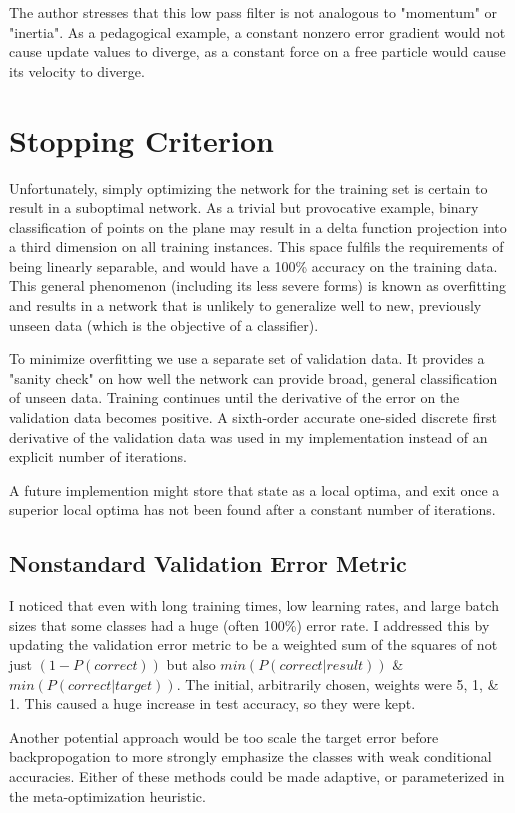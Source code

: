 \documentclass[10pt, conference, compsocconf]{IEEEtran}
\begin{document}
The author stresses that this low pass filter is not analogous to "momentum" or "inertia". As a pedagogical example, a constant nonzero error gradient would not cause update values to diverge, as a constant force on a free particle would cause its velocity to diverge.


\section{Stopping Criterion}
Unfortunately, simply optimizing the network for the training set is certain to result in a suboptimal network. As a trivial but provocative example, binary classification of points on the plane may result in a delta function projection into a third dimension on all training instances. This space fulfils the requirements of being linearly separable, and would have a 100\% accuracy on the training data. This general phenomenon (including its less severe forms) is known as overfitting and results in a network that is unlikely to generalize well to new, previously unseen data (which is the objective of a classifier). 

To minimize overfitting we use a separate set of validation data. It provides a "sanity check" on how well the network can provide broad, general classification of unseen data. Training continues until the derivative of the error on the validation data becomes positive. A sixth-order accurate one-sided discrete first derivative of the validation data was used in my implementation instead of an explicit number of iterations.

A future implemention might store that state as a local optima, and exit once a superior local optima has not been found after a constant number of iterations.

\subsection{Nonstandard Validation Error Metric}
I noticed that even with long training times, low learning rates, and large batch sizes that some classes had a huge (often 100\%) error rate. I addressed this by updating the validation error metric to be a weighted sum of the squares of not just $(1-P(correct))$ but also $min(P(correct | result))$ \& $min(P(correct | target))$. The initial, arbitrarily chosen, weights were 5, 1, \& 1. This caused a huge increase in test accuracy, so they were kept. 

Another potential approach would be too scale the target error before backpropogation to more strongly emphasize the classes with weak conditional accuracies. Either of these methods could be made adaptive, or parameterized in the meta-optimization heuristic. 
\end{document}

